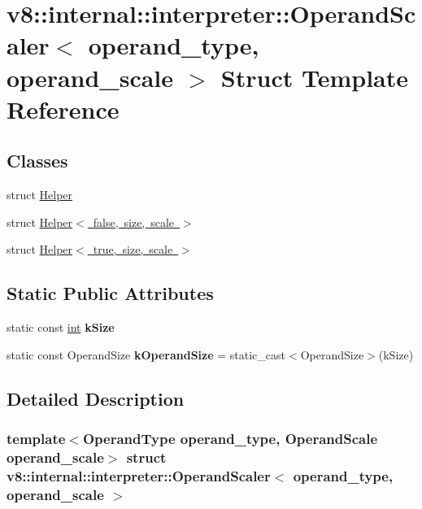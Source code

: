 \hypertarget{structv8_1_1internal_1_1interpreter_1_1OperandScaler}{}\section{v8\+:\+:internal\+:\+:interpreter\+:\+:Operand\+Scaler$<$ operand\+\_\+type, operand\+\_\+scale $>$ Struct Template Reference}
\label{structv8_1_1internal_1_1interpreter_1_1OperandScaler}
\subsection*{Classes}
\begin{DoxyCompactItemize}
\item 
struct \mbox{\hyperlink{structv8_1_1internal_1_1interpreter_1_1OperandScaler_1_1Helper}{Helper}}
\item 
struct \mbox{\hyperlink{structv8_1_1internal_1_1interpreter_1_1OperandScaler_1_1Helper_3_01false_00_01size_00_01scale_01_4}{Helper$<$ false, size, scale $>$}}
\item 
struct \mbox{\hyperlink{structv8_1_1internal_1_1interpreter_1_1OperandScaler_1_1Helper_3_01true_00_01size_00_01scale_01_4}{Helper$<$ true, size, scale $>$}}
\end{DoxyCompactItemize}
\subsection*{Static Public Attributes}
\begin{DoxyCompactItemize}
\item 
static const \mbox{\hyperlink{classint}{int}} {\bfseries k\+Size}
\item 
\mbox{\label{structv8_1_1internal_1_1interpreter_1_1OperandScaler_ae8a29ace7ee9572510145173b84e8a00}} 
static const Operand\+Size {\bfseries k\+Operand\+Size} = static\+\_\+cast$<$Operand\+Size$>$(k\+Size)
\end{DoxyCompactItemize}


\subsection{Detailed Description}
\subsubsection*{template$<$Operand\+Type operand\+\_\+type, Operand\+Scale operand\+\_\+scale$>$\newline
struct v8\+::internal\+::interpreter\+::\+Operand\+Scaler$<$ operand\+\_\+type, operand\+\_\+scale $>$}



